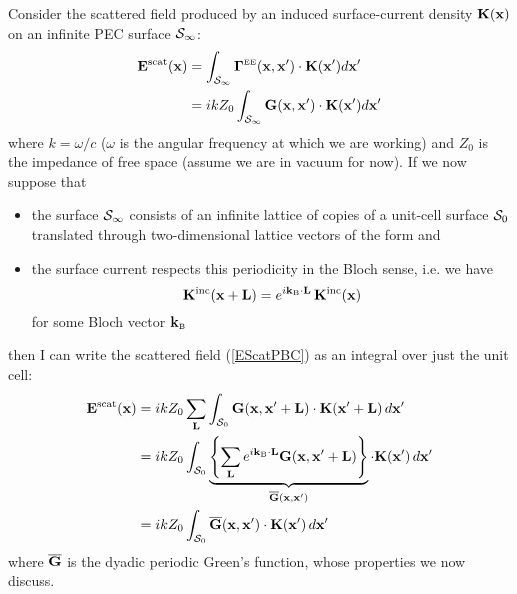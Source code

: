 Consider the scattered field produced by an 
induced surface-current density $\mathbf{K}(\mathbf{x})$ on
an infinite PEC surface $\mathcal{S}_\infty$:
\begin{align}
  \mathbf{E}^{\hbox{\scriptsize{scat}}}(\mathbf{x})
&=
  \int_{\mathcal{S}_\infty} 
   \boldsymbol{\Gamma}^{\hbox{\tiny{EE}}}(\mathbf{x}, \mathbf{x}^\prime)
   \cdot 
   \mathbf{K}(\mathbf{x}^\prime)d\mathbf{x}^\prime
\\
&=
  ikZ_0
  \int_{\mathcal{S}_\infty} 
   \mathbf{G}(\mathbf{x}, \mathbf{x}^\prime) 
   \cdot 
   \mathbf{K}(\mathbf{x}^\prime)d\mathbf{x}^\prime
\label{EScatPBC}
\end{align}
where $k=\omega/c$ ($\omega$ is the angular frequency
at which we are working) and $Z_0$ is the impedance
of free space (assume we are in vacuum for now).
If we now suppose that 
\begin{itemize}
 \item the surface $\mathcal{S}_\infty$ consists of an infinite lattice
       of copies of a unit-cell surface $\mathcal{S}_0$ translated through
       two-dimensional lattice vectors of the form 
       and
 \item the surface current respects this periodicity in the 
       Bloch sense, i.e. we have
       $$ \mathbf{K}^{\hbox{\scriptsize{inc}}}(\mathbf{x}+\mathbf{L})
          = e^{i\mathbf{k}_{\hbox{\tiny{B}}} \cdot \mathbf{L}} \, \mathbf{K}^{\hbox{\scriptsize{inc}}}(\mathbf{x})
       $$
       for some Bloch vector $\mathbf{k}_{\hbox{\tiny{B}}}$
\end{itemize}
then I can write the scattered field (\ref{EScatPBC}) as an integral
over just the unit cell:
\begin{align}
   \mathbf{E}^{\hbox{\scriptsize{scat}}}(\mathbf{x})
&= ikZ_0 
   \sum_{\mathbf{L}}
   \int_{\mathcal{S}_0}
   \mathbf{G}(\mathbf{x}, \mathbf{x}^\prime+\mathbf{L})
   \cdot 
   \mathbf{K}(\mathbf{x}^\prime + \mathbf{L} ) \, d\mathbf{x}^\prime
\nonumber \\
&= ikZ_0
   \int_{\mathcal{S}_0}
   \underbrace{
   \left\{
   \sum_{\mathbf{L}}
   e^{i\mathbf{k}_{\hbox{\tiny{B}}} \cdot \mathbf{L}}
   \mathbf{G}(\mathbf{x}, \mathbf{x}^\prime+\mathbf{L})
   \right\}
              }_{\overline{\mathbf{G}}(\mathbf{x}, \mathbf{x}^\prime)}
   \cdot 
   \mathbf{K}(\mathbf{x}^\prime) \, d\mathbf{x}^\prime
\nonumber \\
&= ikZ_0 
   \int_{\mathcal{S}_0}
   \overline{\mathbf{G}}(\mathbf{x}, \mathbf{x}^\prime)
   \cdot 
   \mathbf{K}(\mathbf{x}^\prime) \, d\mathbf{x}^\prime
\label{EScatPBC}
\end{align}
where $\overline{\mathbf{G}}$ is the dyadic periodic Green's function,
whose properties we now discuss.

